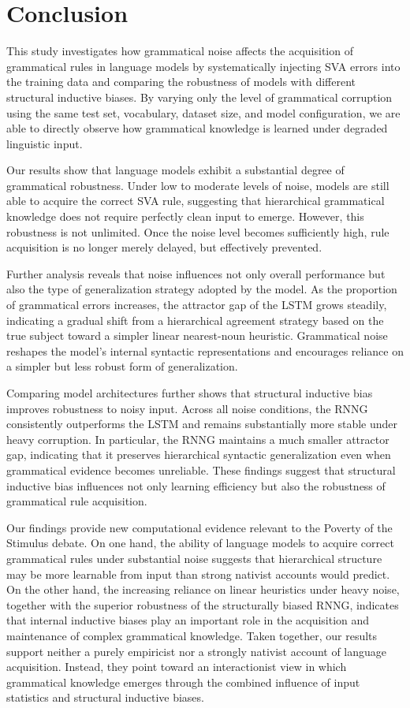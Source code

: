 \section{Conclusion}
\label{sec:conclusion}

This study investigates how grammatical noise affects the acquisition of grammatical rules in language models by systematically injecting SVA errors into the training data and comparing the robustness of models with different structural inductive biases. By varying only the level of grammatical corruption using the same test set, vocabulary, dataset size, and model configuration, we are able to directly observe how grammatical knowledge is learned under degraded linguistic input.

Our results show that language models exhibit a substantial degree of grammatical robustness. Under low to moderate levels of noise, models are still able to acquire the correct SVA rule, suggesting that hierarchical grammatical knowledge does not require perfectly clean input to emerge. However, this robustness is not unlimited. Once the noise level becomes sufficiently high, rule acquisition is no longer merely delayed, but effectively prevented.

Further analysis reveals that noise influences not only overall performance but also the type of generalization strategy adopted by the model. As the proportion of grammatical errors increases, the attractor gap of the LSTM grows steadily, indicating a gradual shift from a hierarchical agreement strategy based on the true subject toward a simpler linear nearest-noun heuristic. Grammatical noise reshapes the model's internal syntactic representations and encourages reliance on a simpler but less robust form of generalization.

Comparing model architectures further shows that structural inductive bias improves robustness to noisy input. Across all noise conditions, the RNNG consistently outperforms the LSTM and remains substantially more stable under heavy corruption. In particular, the RNNG maintains a much smaller attractor gap, indicating that it preserves hierarchical syntactic generalization even when grammatical evidence becomes unreliable. These findings suggest that structural inductive bias influences not only learning efficiency but also the robustness of grammatical rule acquisition.

Our findings provide new computational evidence relevant to the Poverty of the Stimulus debate. On one hand, the ability of language models to acquire correct grammatical rules under substantial noise suggests that hierarchical structure may be more learnable from input than strong nativist accounts would predict. On the other hand, the increasing reliance on linear heuristics under heavy noise, together with the superior robustness of the structurally biased RNNG, indicates that internal inductive biases play an important role in the acquisition and maintenance of complex grammatical knowledge. Taken together, our results support neither a purely empiricist nor a strongly nativist account of language acquisition. Instead, they point toward an interactionist view in which grammatical knowledge emerges through the combined influence of input statistics and structural inductive biases.

